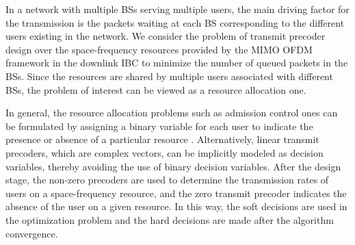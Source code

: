 In a network with multiple \acp{BS} serving multiple users, the main driving factor for the transmission is the packets waiting at each \ac{BS} corresponding to the different users existing in the network. We consider the problem of transmit precoder design over the space-frequency resources provided by the \ac{MIMO} \ac{OFDM} framework in the downlink \ac{IBC} to minimize the number of queued packets in the \acp{BS}. Since the resources are shared by multiple users associated with different \acp{BS}, the problem of interest can be viewed as a resource allocation one.

In general, the resource allocation problems such as admission control ones can be formulated by assigning a binary variable for each user to indicate the presence or absence of a particular resource \cite{admission_control}. Alternatively, linear transmit precoders, which are complex vectors, can be implicitly modeled as decision variables, thereby avoiding the use of binary decision variables. After the design stage, the non-zero precoders are used to determine the transmission rates of users on a space-frequency resource, and the zero transmit precoder indicates the absence of the user on a given resource. In this way, the soft decisions are used in the optimization problem and the hard decisions are made after the algorithm convergence.

